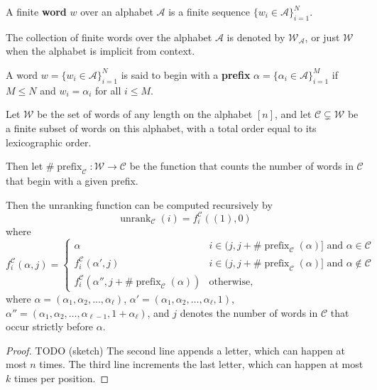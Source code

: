 \begin{definition}
  A finite \textbf{word} $w$ over an alphabet $\mathcal A$ is a finite sequence
  $\{w_i \in \mathcal A\}_{i=1}^N$.

  The collection of finite words over the alphabet $\mathcal A$ is denoted by
  $\mathcal{W}_\mathcal{A}$, or just $\mathcal{W}$ when the alphabet is
  implicit from context.
\end{definition}

\begin{definition}
  A word $w = \{w_i \in \mathcal A\}_{i=1}^N$ is said to begin with a
  \textbf{prefix} $\alpha = \{\alpha_i \in \mathcal A\}_{i=1}^M$ if
  $M \leq N$ and $w_i = \alpha_i$ for all $i \leq M$.
\end{definition}

\begin{lemma}
  Let $\mathcal{W}$ be the set of words of any length on the alphabet $[n]$,
  and let $\mathcal C \subsetneq \mathcal{W}$ be a finite subset of words
  on this alphabet, with a total order equal to its lexicographic order.

  Then let
  $\#\operatorname{prefix}_{\mathcal C}\colon \mathcal{W} \rightarrow \mathcal{C}$
  be the function that counts the number of words in $\mathcal C$ that begin
  with a given prefix.

  Then the unranking function can be computed recursively by \[
    \operatorname{unrank}_\mathcal{C}(i) = f^{\mathcal C}_i((1), 0)
  \] where
  \begin{equation}
  f^{\mathcal C}_i(\alpha, j) = \begin{cases}
    \alpha
      & i \in (j, j + \#\operatorname{prefix}_\mathcal{C}(\alpha)] \text{ and } \alpha \in \mathcal{C} \\
    f^{\mathcal C}_i(\alpha', j)
      & i \in (j, j + \#\operatorname{prefix}_\mathcal{C}(\alpha)] \text{ and } \alpha \not\in \mathcal{C} \\
    f^{\mathcal C}_i(\alpha'', j + \#\operatorname{prefix}_\mathcal{C}(\alpha))
      & \text{otherwise},
  \end{cases}
\end{equation}
where
$\alpha = (\alpha_1, \alpha_2, \dots, \alpha_\ell)$,
$\alpha' = (\alpha_1, \alpha_2, \dots, \alpha_\ell, 1)$,
$\alpha'' = (\alpha_1, \alpha_2, \dots, \alpha_{\ell-1}, 1 + \alpha_\ell)$,
and $j$ denotes the number of words in $\mathcal{C}$ that occur strictly
before $\alpha$.
\label{lemma:unrankFromPrefix}
\end{lemma}
\begin{proof}
  TODO (sketch)
  The second line appends a letter, which can happen at most $n$ times.
  The third line increments the last letter, which can happen at most $k$ times
  per position.
\end{proof}

